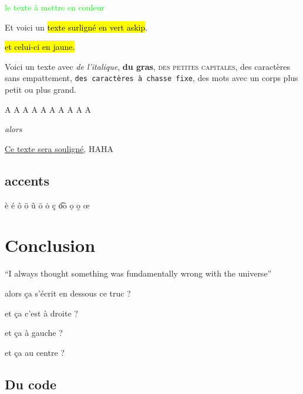 \documentclass{article}
\begin{document}
\textcolor{lime}{le texte \`a mettre en couleur}\\


Et voici un \hl{texte surlign\'e en vert askip}.


\hl{et celui-ci en jaune.}


Voici un texte avec
\textit{de l'italique},
\textbf{du gras},
\textsc{des petites capitales},
\textsf{des caractères sans empattement},
\texttt{des caractères à chasse fixe},
des mots avec {\small{un corps plus petit}} ou {\large{plus grand}}.\par

{\tiny A}
{\scriptsize A}
{\footnotesize A}
{\small A}
{\normalsize A}
{\large A}
{\Large A}
{\LARGE A}
{\huge A}
{\Huge A}

\emph{alors}

\underline{Ce texte sera souligné}, HAHA

\subsection{accents}

\`e
\'e
\^o
\"o
\~u
\=o
\.o
\c{c}
\t{oo}
\d{o}
\b{o}
\oe{}

\section{Conclusion}
``I always thought something was fundamentally wrong with the universe'' \autocite[1]{adams1995hitchhiker}

\vfill

alors ça s'écrit en dessous ce truc ?

\begin{flushright} et ça c'est à droite ?\end{flushright}

\begin{flushleft} et ça à gauche ?\end{flushleft}

\begin{center}et ça au centre ?\end{center}

\newpage

\subsection{Du code}
\end{document}
